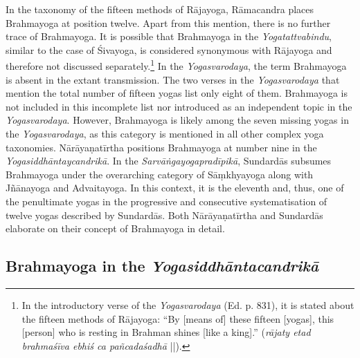 In the taxonomy of the fifteen methods of Rājayoga, Rāmacandra places Brahmayoga at position twelve. Apart from this mention, there is no further trace of Brahmayoga. It is possible that Brahmayoga in the \emph{Yogatattvabindu}, similar to the case of Śivayoga, is considered synonymous with Rājayoga and therefore not discussed separately.\footnote{In the introductory verse of the \emph{Yogasvarodaya} (Ed. p. 831), it is stated about the fifteen methods of Rājayoga: ``By [means of] these fifteen [yogas], this [person] who is resting in Brahman shines [like a king].'' (\textit{rājaty etad brahmaśīva ebhiś ca pañcadaśadhā} ||).} In the \textit{Yogasvarodaya}, the term Brahmayoga is absent in the extant transmission. The two verses in the \textit{Yogasvarodaya} that mention the total number of fifteen yogas list only eight of them. Brahmayoga is not included in this incomplete list nor introduced as an independent topic in the \textit{Yogasvarodaya}. However, Brahmayoga is likely among the seven missing yogas in the \textit{Yogasvarodaya}, as this category is mentioned in all other complex yoga taxonomies. Nārāyaṇatīrtha positions Brahmayoga at number nine in the \textit{Yogasiddhāntaycandrikā}. In the \textit{Sarvāṅgayogapradīpikā}, Sundardās subsumes Brahmayoga under the overarching category of Sāṃkhyayoga along with Jñānayoga and Advaitayoga. In this context, it is the eleventh and, thus, one of the penultimate yogas in the progressive and consecutive systematisation of twelve yogas described by Sundardās. Both Nārāyaṇatīrtha and Sundardās elaborate on their concept of Brahmayoga in detail. 

\subsection{Brahmayoga in the \textit{Yogasiddhāntacandrikā}}

